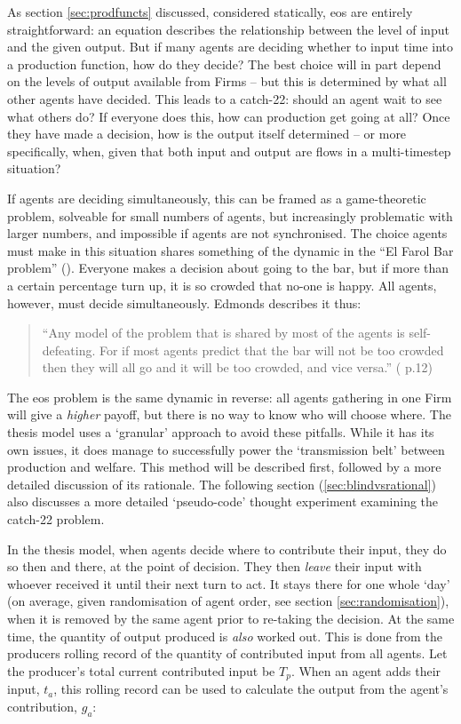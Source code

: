 {As section \ref{sec:prodfuncts} discussed, considered statically, \gls{eos} are entirely straightforward: an equation describes the relationship between the level of input and the given output. But if many agents are deciding whether to input time into a production function, how do they decide? The best choice will in part depend on the levels of output available from Firms – but this is determined by what all other agents have decided. This leads to a catch-22: should an agent wait to see what others do? If everyone does this, how can production get going at all? Once they have made a decision, how is the output itself determined – or more specifically, when, given that both input and output are flows in a multi-timestep situation?

If agents are deciding simultaneously, this can be framed as a game-theoretic problem, solveable for small numbers of agents, but increasingly problematic with larger numbers, and impossible if agents are not synchronised. The choice agents must make in this situation shares something of the dynamic in the ``El Farol Bar problem'' (\citealt{ arthur_inductive_1994}). Everyone makes a decision about going to the bar, but if more than a certain percentage turn up, it is so crowded that no-one is happy. All agents, however, must decide simultaneously. Edmonds describes it thus:

\begin{quote}
``Any model of the problem that is shared by most of the agents is self-defeating. For if most agents predict that the bar will not be too crowded then they will all go and it will be too crowded, and vice versa.'' (\citealt{brenner_modelling_1999} p.12)
\end{quote}

The \gls{eos} problem is the same dynamic in reverse: all agents gathering in one Firm will give a \emph{higher} payoff, but there is no way to know who will choose where. The thesis model uses a `granular' approach to avoid these pitfalls. While it has its own issues, it does manage to successfully power the `transmission belt' between production and welfare. This method will be described first, followed by a more detailed discussion of its rationale. The following section (\ref{sec:blindvsrational}) also discusses a more detailed `pseudo-code' thought experiment examining the catch-22 problem.

In the thesis model, when agents decide where to contribute their input, they do so then and there, at the point of decision. They then \emph{leave} their input with whoever received it until their next turn to act. It stays there for one whole `day' (on average, given randomisation of agent order, see section \ref{sec:randomisation}), when it is removed by the same agent prior to re-taking the decision. At the same time, the quantity of output produced is \emph{also} worked out. This is done from the producers rolling record of the quantity of contributed input from all agents. Let the producer's total current contributed input be $T_p$. When an agent adds their input, $t_a$, this rolling record can be used to calculate the output from the agent's contribution, $g_a$:

}
